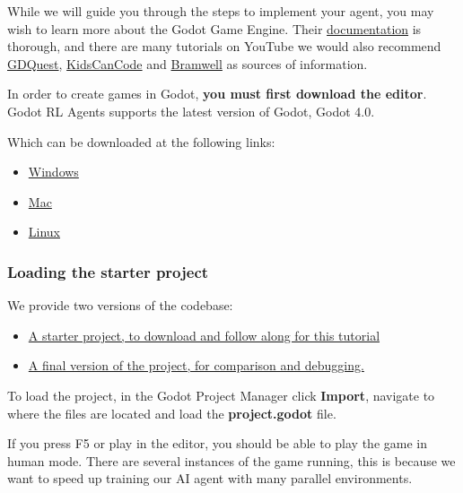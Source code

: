 \documentclass[11pt,a4paper]{article}
\begin{document}
While we will guide you through the steps to implement your agent, you may wish to learn more about the Godot Game Engine. Their \href{https://docs.godotengine.org/en/latest/index.html}{documentation} is thorough, and there are many tutorials on YouTube we would also recommend \href{https://www.gdquest.com/}{GDQuest}, \href{https://kidscancode.org/godot_recipes/4.x/}{KidsCanCode} and \href{https://www.youtube.com/channel/UCczi7Aq_dTKrQPF5ZV5J3gg}{Bramwell} as sources of information.

In order to create games in Godot, \textbf{you must first download the editor}. Godot RL Agents supports the latest version of Godot, Godot 4.0.

Which can be downloaded at the following links:

\begin{itemize}
\item
  \href{https://downloads.tuxfamily.org/godotengine/4.0.1/Godot_v4.0.1-stable_win64.exe.zip}{Windows}
\item
  \href{https://downloads.tuxfamily.org/godotengine/4.0.1/Godot_v4.0.1-stable_macos.universal.zip}{Mac}
\item
  \href{https://downloads.tuxfamily.org/godotengine/4.0.1/Godot_v4.0.1-stable_linux.x86_64.zip}{Linux}
\end{itemize}

\subsubsection{Loading the starter project}\label{loading-the-starter-project}

We provide two versions of the codebase:

\begin{itemize}
\item
  \href{https://drive.google.com/file/d/1C7xd3TibJHlxFEJPBgBLpksgxrFZ3D8e/view?usp=share_link}{A starter project, to download and follow along for this tutorial}
\item
  \href{https://drive.google.com/file/d/1k-b2Bu7uIA6poApbouX4c3sq98xqogpZ/view?usp=share_link}{A final version of the project, for comparison and debugging.}
\end{itemize}

To load the project, in the Godot Project Manager click \textbf{Import}, navigate to where the files are located and load the \textbf{project.godot} file.

If you press F5 or play in the editor, you should be able to play the game in human mode. There are several instances of the game running, this is because we want to speed up training our AI agent with many parallel environments.
\end{document}
